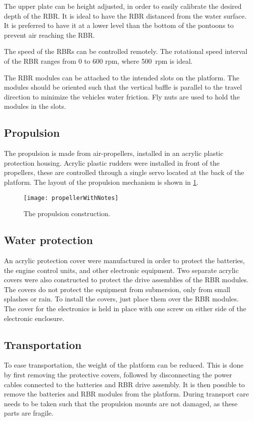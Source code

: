 The upper plate can be height adjusted, in order to easily calibrate the desired depth of the RBR. It is ideal to have the RBR distanced from the water surface. It is preferred to have it at a lower level than the bottom of the pontoons to prevent air reaching the RBR. 

The speed of the RBRs can be controlled remotely. The rotational speed interval of the RBR ranges from 0 to 600 rpm, where 500~rpm is ideal.


The RBR modules can be attached to the intended slots on the platform. The modules should be oriented such that the vertical baffle is parallel to the travel direction to minimize the vehicles water friction. Fly nuts are used to hold the modules in the slots. 

\subsection{Propulsion}
The propulsion is made from air-propellers, installed in an acrylic plastic protection housing. Acrylic plastic rudders were installed in front of the propellers, these are controlled through a single servo located at the back of the platform. The layout of the propulsion mechanism is shown in \cref{fig:propellerWithNotes}.

\begin{figure}[h]
   \centering
   \texttt{[image: propellerWithNotes]}
   \caption{The propulsion construction.}
   \label{fig:propellerWithNotes}
\end{figure}

\subsection{Water protection}

An acrylic protection cover were manufactured in order to protect the batteries, the engine control units, and other electronic equipment. Two separate acrylic covers were also constructed to protect the drive assemblies of the RBR modules. The covers do not protect the equipment from submersion, only from small splashes or rain. To install the covers, just place them over the RBR modules. The cover for the electronics is held in place with one screw on either side of the electronic enclosure.

\subsection{Transportation}

To ease transportation, the weight of the platform can be reduced. This is done by first removing the protective covers, followed by disconnecting the power cables connected to the batteries and RBR drive assembly. It is then possible to remove the batteries and RBR modules from the platform. During transport care needs to be taken such that the propulsion mounts are not damaged, as these parts are fragile.
